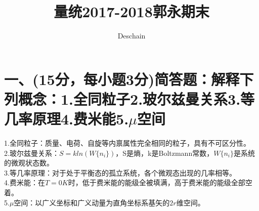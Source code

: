 \documentclass[UTF8]{ctexart}
\title{量统2017-2018郭永期末}
\author{Deschain}
\begin{document}
\maketitle
\section*{一、(15分，每小题3分)简答题：解释下列概念：1.全同粒子2.玻尔兹曼关系3.等几率原理4.费米能5.$\mu$空间}
1.全同粒子：质量、电荷、自旋等内禀属性完全相同的粒子，具有不可区分性。\\
2.玻尔兹曼关系：$S=kln(W\{n_i\})$，S是熵，k是Boltzmann常数，$W\{n_i\}$是系统的微观状态数。\\
3.等几率原理：对于处于平衡态的孤立系统，各个微观态出现的几率相等。\\
4.费米能：在$T=0K$时，低于费米能的能级全被填满，高于费米能的能级全部空着。\\
5.$\mu$空间：以广义坐标和广义动量为直角坐标系基矢的$2r$维空间。
\end{document}
